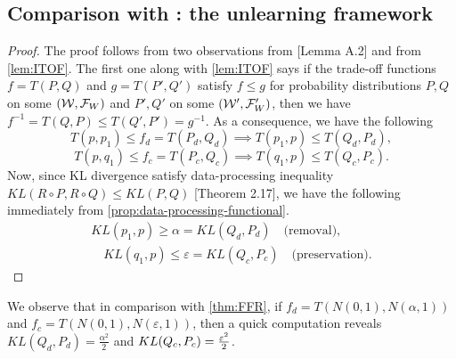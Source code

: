 \subsection{Comparison with \citet{allouah2025distributionalmachineunlearningselective}: the unlearning framework}
\CoD* 
\begin{proof} \label{proof:CoD}
    The proof follows from two observations from \cite{dong2022gaussian}[Lemma A.2] and from \ref{lem:ITOF}. The first one along with \ref{lem:ITOF} says if the trade-off functions $f=T(P, Q)$ and $g=T(P',Q') $ satisfy $f\leq g$ for probability distributions $P,Q$ on some $(\mathcal{W}, \mathcal{F}_W)$ and $P',Q'$ on some $(\mathcal{W}', \mathcal{F}_W')$, then we have  $f^{-1}=T(Q, P) \leq T(Q',P')=  g^{-1}$. As a consequence, we have the following
    \begin{equation}
        T(p,p_1) \leq f_d=T(P_d,Q_d) \implies   T(p_1,p) \leq T(Q_d,P_d),
    \end{equation}
    \begin{equation}
        T(p,q_1) \leq f_c= T(P_c,Q_c) \implies   T(q_1,p) \leq T(Q_c,P_c).
    \end{equation}
    Now, since KL divergence satisfy data-processing inequality $KL(R\circ P,R\circ Q) \leq KL(P,Q)$ \cite{polyanskiy_wu_2025}[Theorem 2.17], we have the following immediately from \ref{prop:data-processing-functional}.
    \begin{align*}
KL(p_1, p) \geq \alpha =KL(Q_d,P_d) \quad\text{(removal)},
\\
\quad 
KL(q_1, p) \leq \varepsilon= KL(Q_c, P_c) \quad\text{(preservation)}.
\end{align*}
\end{proof}

\begin{remark}
    We observe that in comparison with \ref{thm:FFR}, if $f_d= T(N(0,1), N(\alpha, 1))$ and $f_c= T(N(0,1), N(\varepsilon, 1))$, then a quick computation reveals $KL(Q_d, P_d)= \frac{\alpha^2}{2}$ and $KL(Q_c, P_c)= \frac{\varepsilon^2}{2}$.
\end{remark}

